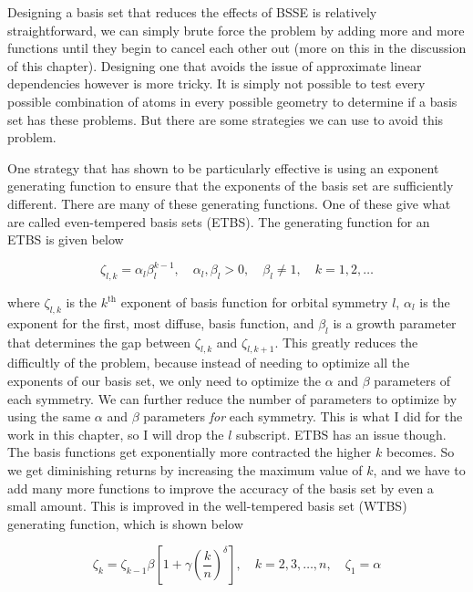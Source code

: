 Designing a basis set that reduces the effects of BSSE is relatively straightforward, we can simply brute force the problem by adding more and more functions until they begin to cancel each other out (more on this in the discussion of this chapter). Designing one that avoids the issue of approximate linear dependencies however is more tricky. It is simply not possible to test every possible combination of atoms in every possible geometry to determine if a basis set has these problems. But there are some strategies we can use to avoid this problem.

One strategy that has shown to be particularly effective is using an exponent generating function to ensure that the exponents of the basis set are sufficiently different. There are many of these generating functions. One of these give what are called even-tempered basis sets (ETBS)\cite{ETBS}. The generating function for an ETBS is given below

\begin{equation}
\label{eq:ETBS_gen}
\zeta_{l,k} = \alpha_{l}\beta^{k-1}_{l}, \quad \alpha_{l}, \beta_{l} > 0, \quad \beta_{l} \neq 1, \quad k = 1, 2, \ldots
\end{equation}

where $\zeta_{l,k}$ is the $k^{\text{th}}$ exponent of basis function for orbital symmetry $l$, $\alpha_{l}$ is the exponent for the first, most diffuse, basis function, and $\beta_{l}$ is a growth parameter that determines the gap between $\zeta_{l,k}$ and $\zeta_{l,k + 1}$. This greatly reduces the difficultly of the problem, because instead of needing to optimize all the exponents of our basis set, we only need to optimize the $\alpha$ and $\beta$ parameters of each symmetry. We can further reduce the number of parameters to optimize by using the same $\alpha$ and $\beta$ parameters \textit{for} each symmetry. This is what I did for the work in this chapter, so I will drop the $l$ subscript. ETBS has an issue though. The basis functions get exponentially more contracted the higher $k$ becomes. So we get diminishing returns by increasing the maximum value of $k$, and we have to add many more functions to improve the accuracy of the basis set by even a small amount. This is improved in the well-tempered basis set (WTBS)\cite{WTBS} generating function, which is shown below

\begin{equation}
\label{eq:WTBS_gen}
\zeta_{k} = \zeta_{k-1}\beta\left[1+\gamma\left(\frac{k}{n}\right)^{\delta}\right], \quad k = 2, 3,\ldots, n, \quad \zeta_{1}=\alpha
\end{equation}

